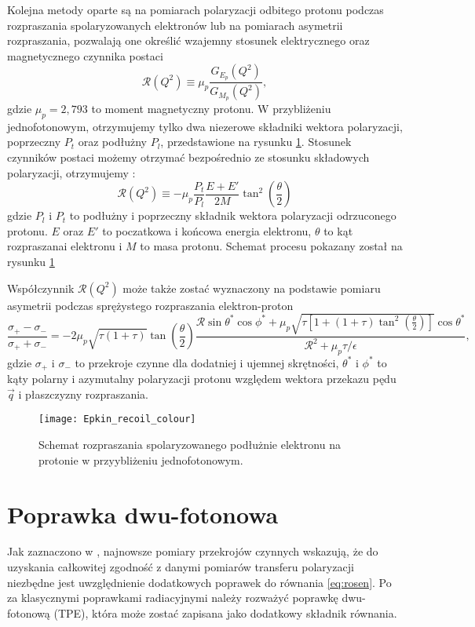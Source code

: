 \documentclass[11pt]{book}
\theoremstyle{definition}
\begin{document}
Kolejna metody oparte są na pomiarach polaryzacji odbitego protonu podczas rozpraszania spolaryzowanych elektronów lub na pomiarach asymetrii rozpraszania, pozwalają one określić wzajemny stosunek elektrycznego oraz magnetycznego czynnika postaci
%
$$
\mathcal{R}\left(Q^2\right) \equiv \mu_p \frac{G_{E_p}\left(Q^2\right)}{G_{M_p}\left(Q^2\right)},
$$
gdzie $\mu_p = 2,793$ to moment magnetyczny protonu. W przybliżeniu jednofotonowym, otrzymujemy tylko dwa niezerowe składniki wektora polaryzacji, poprzeczny $P_t$ oraz podłużny $P_l$, przedstawione na rysunku \ref{fig:recoil}. Stosunek czynników postaci możemy otrzymać bezpośrednio ze stosunku składowych polaryzacji, otrzymujemy \cite{2007PrPNP..59..694P}:
%
$$
\mathcal{R}\left(Q^2\right) \equiv -\mu_p  \frac{P_t}{P_l} \frac{E + E'}{2M} \tan^2  \left(\frac{\theta}{2}\right) 
$$
%
gdzie $P_l$ i $P_t$ to podłużny i poprzeczny składnik wektora polaryzacji odrzuconego protonu. $E$ oraz $E'$ to poczatkowa i końcowa energia elektronu, $\theta$ to kąt rozpraszanai elektronu i $M$ to masa protonu. Schemat procesu pokazany został na rysunku \ref{fig:recoil}
%

Współczynnik $\mathcal{R}\left(Q^2\right)$ może także zostać wyznaczony na podstawie pomiaru asymetrii podczas sprężystego rozpraszania elektron-proton \cite{2009PhRvC..79f5204A, 2007PrPNP..59..694P}
%
$$
\frac{\sigma_+ - \sigma_-}{\sigma_+ + \sigma_-} = -2\mu_p \sqrt{\tau \left(1+\tau\right)} \tan \left(\frac{\theta}{2}\right) \frac{\mathcal{R} \sin \theta^* \cos \phi^* + \mu_p \sqrt{\tau \left[ 1 + \left(1+\tau\right) \tan^2 \left(\frac{\theta}{2}\right) \right]} \cos \theta^* }{\mathcal{R}^2 + \mu_p \tau / \epsilon},
$$
%
gdzie $\sigma_+$ i $\sigma_-$ to przekroje czynne dla dodatniej i ujemnej skrętności, $\theta^*$ i $\phi^*$ to kąty polarny i azymutalny polaryzacji protonu względem wektora przekazu pędu $\vec{q}$ i płaszczyzny rozpraszania.
%

\begin{figure}[htp!]
	\centering
	\texttt{[image: Epkin\_recoil\_colour]}
	\caption{Schemat rozpraszania spolaryzowanego podłużnie elektronu na protonie w przyybliżeniu jednofotonowym.} 
	\label{fig:recoil}
\end{figure}



\section{Poprawka dwu-fotonowa}
Jak zaznaczono w \cite{2007PhRvC..76c5205A}, najnowsze pomiary przekrojów czynnych wskazują, że do uzyskania całkowitej zgodność z danymi pomiarów transferu polaryzacji niezbędne jest uwzględnienie dodatkowych poprawek do równania \ref{eq:rosen}. Po za klasycznymi poprawkami radiacyjnymi należy rozważyć poprawkę dwu-fotonową (TPE), która może zostać zapisana jako dodatkowy składnik równania.
\end{document}
